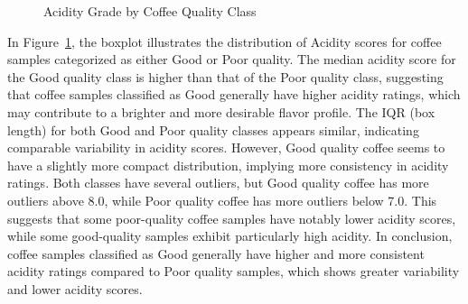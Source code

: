 \documentclass[
  letterpaper,
  DIV=11,
  numbers=noendperiod]{scrartcl}
\begin{document}
\begin{figure}[H]


\caption{\label{fig-boxplot3}Acidity Grade by Coffee Quality Class}

\end{figure}%

In Figure~\ref{fig-boxplot3}, the boxplot illustrates the distribution
of Acidity scores for coffee samples categorized as either Good or Poor
quality. The median acidity score for the Good quality class is higher
than that of the Poor quality class, suggesting that coffee samples
classified as Good generally have higher acidity ratings, which may
contribute to a brighter and more desirable flavor profile. The IQR (box
length) for both Good and Poor quality classes appears similar,
indicating comparable variability in acidity scores. However, Good
quality coffee seems to have a slightly more compact distribution,
implying more consistency in acidity ratings. Both classes have several
outliers, but Good quality coffee has more outliers above 8.0, while
Poor quality coffee has more outliers below 7.0. This suggests that some
poor-quality coffee samples have notably lower acidity scores, while
some good-quality samples exhibit particularly high acidity. In
conclusion, coffee samples classified as Good generally have higher and
more consistent acidity ratings compared to Poor quality samples, which
shows greater variability and lower acidity scores.
\end{document}
